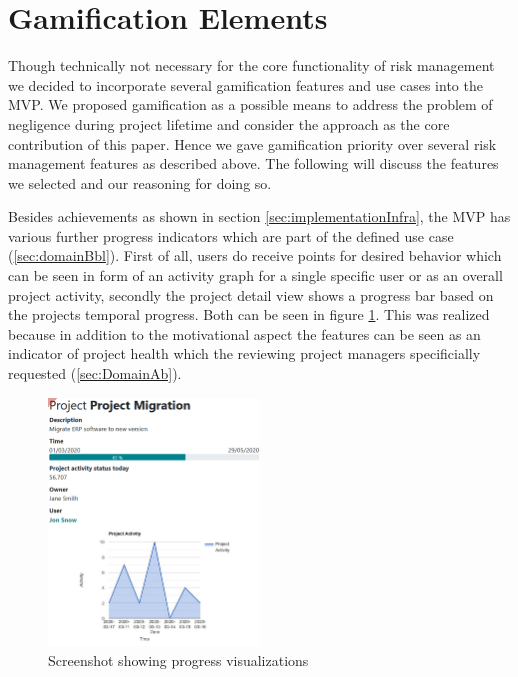 
\section{Gamification Elements}
\label{sec:implementationGami}

Though technically not necessary for the core functionality of risk management we decided to incorporate several gamification features and use cases into the \ac{MVP}. We proposed gamification as a possible means to address the problem of negligence during project lifetime and consider the approach as the core contribution of this paper. Hence we gave gamification priority over several risk management features as described above. The following will discuss the features we selected and our reasoning for doing so.

Besides achievements as shown in section \ref{sec:implementationInfra}, the \ac{MVP} has various further progress indicators which are part of the defined use case (\ref{sec:domainBbl}). First of all, users do receive points for desired behavior which can be seen in form of an activity graph for a single specific user or as an overall project activity, secondly the project detail view shows a progress bar based on the projects temporal progress. Both can be seen in figure \ref{fig:projectdetail}. This was realized because in addition to the motivational aspect the features can be seen as an indicator of project health which the reviewing project managers specificially requested (\ref{sec:DomainAb}).

\begin{figure}
	\includegraphics[width=0.5\textwidth]{Assets/implementation_shots/projectdetail.png}
	\caption{Screenshot showing progress visualizations}
	\label{fig:projectdetail}
\end{figure}

